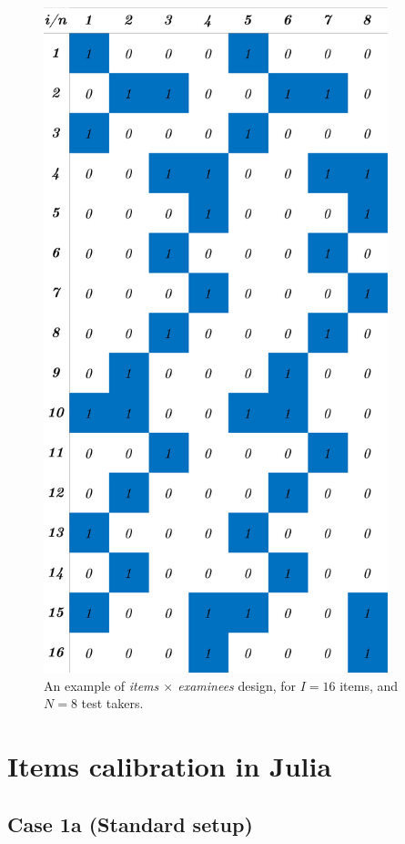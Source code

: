 \begin{figure}[ht]
	\centering
	\includegraphics[width=10cm]{Figures/itemsxexaminees.png}
	\caption{An example of \emph{items $\times$ examinees} design, for $I=16$ items, and $N=8$ test takers.}
	\label{fig:itemsxexaminees}
\end{figure}


\section{Items calibration in Julia}
\subsection{Case 1a (Standard setup)}


